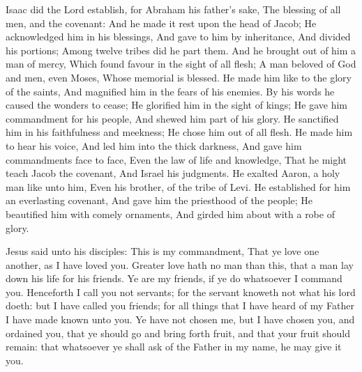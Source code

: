  Isaac did the Lord establish, for Abraham his father's sake, The blessing of all men, and the covenant: And he made it rest upon the head of Jacob; He acknowledged him in his blessings, And gave to him by inheritance, And divided his portions; Among twelve tribes did he part them. And he brought out of him a man of mercy, Which found favour in the sight of all flesh; A man beloved of God and men, even Moses, Whose memorial is blessed. He made him like to the glory of the saints, And magnified him in the fears of his enemies. By his words he caused the wonders to cease; He glorified him in the sight of kings; He gave him commandment for his people, And shewed him part of his glory. He sanctified him in his faithfulness and meekness; He chose him out of all flesh. He made him to hear his voice, And led him into the thick darkness, And gave him commandments face to face, Even the law of life and knowledge, That he might teach Jacob the covenant, And Israel his judgments. He exalted Aaron, a holy man like unto him, Even his brother, of the tribe of Levi. He established for him an everlasting covenant, And gave him the priesthood of the people; He beautified him with comely ornaments, And girded him about with a robe of glory.


 Jesus said unto his disciples: This is my commandment, That ye love one another, as I have loved you. Greater love hath no man than this, that a man lay down his life for his friends. Ye are my friends, if ye do whatsoever I command you. Henceforth I call you not servants; for the servant knoweth not what his lord doeth: but I have called you friends; for all things that I have heard of my Father I have made known unto you. Ye have not chosen me, but I have chosen you, and ordained you, that ye should go and bring forth fruit, and that your fruit should remain: that whatsoever ye shall ask of the Father in my name, he may give it you.


